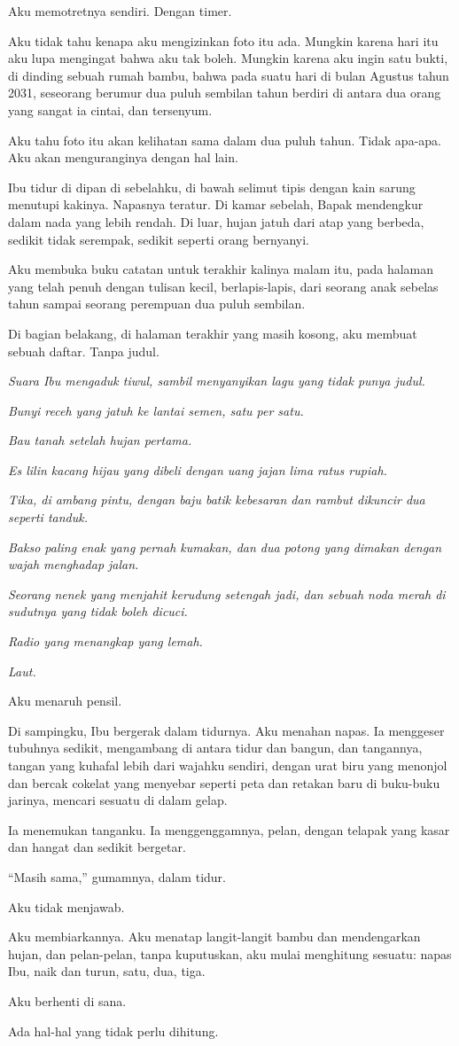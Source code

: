 \documentclass[11pt,twoside,openany]{book}
\begin{document}
Aku memotretnya sendiri. Dengan timer.

Aku tidak tahu kenapa aku mengizinkan foto itu ada. Mungkin karena hari itu aku lupa mengingat bahwa aku tak boleh. Mungkin karena aku ingin satu bukti, di dinding sebuah rumah bambu, bahwa pada suatu hari di bulan Agustus tahun 2031, seseorang berumur dua puluh sembilan tahun berdiri di antara dua orang yang sangat ia cintai, dan tersenyum.

Aku tahu foto itu akan kelihatan sama dalam dua puluh tahun. Tidak apa-apa. Aku akan menguranginya dengan hal lain.

Ibu tidur di dipan di sebelahku, di bawah selimut tipis dengan kain sarung menutupi kakinya. Napasnya teratur. Di kamar sebelah, Bapak mendengkur dalam nada yang lebih rendah. Di luar, hujan jatuh dari atap yang berbeda, sedikit tidak serempak, sedikit seperti orang bernyanyi.

Aku membuka buku catatan untuk terakhir kalinya malam itu, pada halaman yang telah penuh dengan tulisan kecil, berlapis-lapis, dari seorang anak sebelas tahun sampai seorang perempuan dua puluh sembilan.

Di bagian belakang, di halaman terakhir yang masih kosong, aku membuat sebuah daftar. Tanpa judul.

\emph{Suara Ibu mengaduk tiwul, sambil menyanyikan lagu yang tidak punya judul.}

\emph{Bunyi receh yang jatuh ke lantai semen, satu per satu.}

\emph{Bau tanah setelah hujan pertama.}

\emph{Es lilin kacang hijau yang dibeli dengan uang jajan lima ratus rupiah.}

\emph{Tika, di ambang pintu, dengan baju batik kebesaran dan rambut dikuncir dua seperti tanduk.}

\emph{Bakso paling enak yang pernah kumakan, dan dua potong yang dimakan dengan wajah menghadap jalan.}

\emph{Seorang nenek yang menjahit kerudung setengah jadi, dan sebuah noda merah di sudutnya yang tidak boleh dicuci.}

\emph{Radio yang menangkap yang lemah.}

\emph{Laut.}

Aku menaruh pensil.

Di sampingku, Ibu bergerak dalam tidurnya. Aku menahan napas. Ia menggeser tubuhnya sedikit, mengambang di antara tidur dan bangun, dan tangannya, tangan yang kuhafal lebih dari wajahku sendiri, dengan urat biru yang menonjol dan bercak cokelat yang menyebar seperti peta dan retakan baru di buku-buku jarinya, mencari sesuatu di dalam gelap.

Ia menemukan tanganku. Ia menggenggamnya, pelan, dengan telapak yang kasar dan hangat dan sedikit bergetar.

``Masih sama,'' gumamnya, dalam tidur.

Aku tidak menjawab.

Aku membiarkannya. Aku menatap langit-langit bambu dan mendengarkan hujan, dan pelan-pelan, tanpa kuputuskan, aku mulai menghitung sesuatu: napas Ibu, naik dan turun, satu, dua, tiga.

Aku berhenti di sana.

Ada hal-hal yang tidak perlu dihitung.
\end{document}
